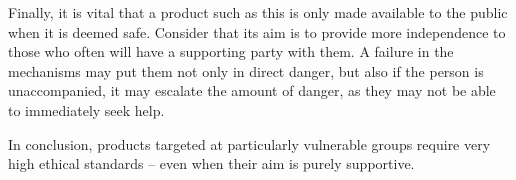 Finally, it is vital that a product such as this is only made available to the public when it is deemed safe.
Consider that its aim is to provide more independence to those who often will have a supporting party with them.
A failure in the mechanisms may put them not only in direct danger, but also if the person is unaccompanied, it may escalate the amount of danger, as they may not be able to immediately seek help.

In conclusion, products targeted at particularly vulnerable groups require very high ethical standards -- even when their aim is purely supportive.